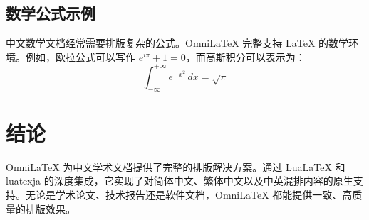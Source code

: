 \documentclass[
    language=chinese,
    doctype=article,
    institution=none,
]{../../omnilatex}
\begin{document}
\subsection{数学公式示例}
中文数学文档经常需要排版复杂的公式。OmniLaTeX 完整支持 \LaTeX{} 的数学环境。例如，欧拉公式可以写作 $e^{i\pi} + 1 = 0$，而高斯积分可以表示为：
\[
\int_{-\infty}^{+\infty} e^{-x^2} \, dx = \sqrt{\pi}
\]

\section{结论}
OmniLaTeX 为中文学术文档提供了完整的排版解决方案。通过 LuaLaTeX 和 luatexja 的深度集成，它实现了对简体中文、繁体中文以及中英混排内容的原生支持。无论是学术论文、技术报告还是软件文档，OmniLaTeX 都能提供一致、高质量的排版效果。
\end{document}
